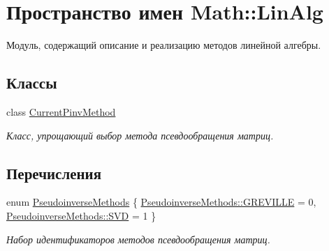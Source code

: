\hypertarget{namespace_math_1_1_lin_alg}{}\section{Пространство имен Math\+:\+:Lin\+Alg}
\label{namespace_math_1_1_lin_alg}


Модуль, содержащий описание и реализацию методов линейной алгебры.  


\subsection*{Классы}
\begin{DoxyCompactItemize}
\item 
class \hyperlink{class_math_1_1_lin_alg_1_1_current_pinv_method}{Current\+Pinv\+Method}
\begin{DoxyCompactList}\small\item\em Класс, упрощающий выбор метода псевдообращения матриц. \end{DoxyCompactList}\end{DoxyCompactItemize}
\subsection*{Перечисления}
\begin{DoxyCompactItemize}
\item 
enum \hyperlink{namespace_math_1_1_lin_alg_a34ee452c5d64eeb10e1bb63cf887af17}{Pseudoinverse\+Methods} \{ \hyperlink{namespace_math_1_1_lin_alg_a34ee452c5d64eeb10e1bb63cf887af17a9febc190323c06d33ae8d8716f98bfe9}{Pseudoinverse\+Methods\+::\+G\+R\+E\+V\+I\+L\+LE} = 0, 
\hyperlink{namespace_math_1_1_lin_alg_a34ee452c5d64eeb10e1bb63cf887af17a595e2d2f1a68ede96e96f849a85370bc}{Pseudoinverse\+Methods\+::\+S\+VD} = 1
 \}\begin{DoxyCompactList}\small\item\em Набор идентификаторов методов псевдообращения матриц. \end{DoxyCompactList}
\end{DoxyCompactItemize}
